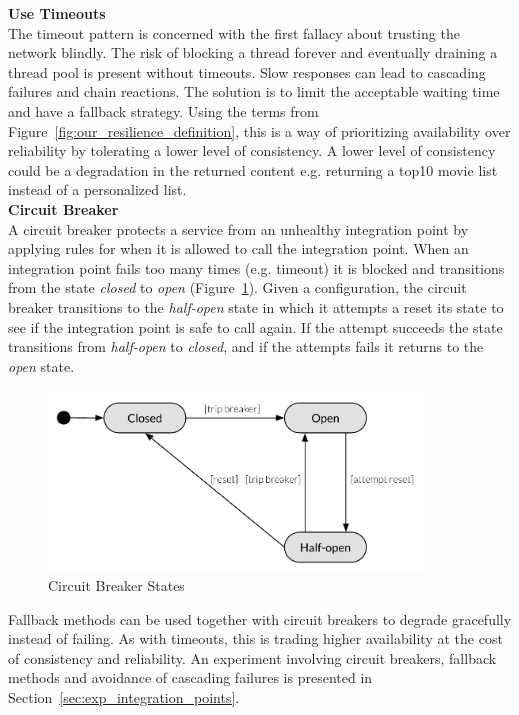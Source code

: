 \noindent \textbf{Use Timeouts}
\\
The timeout pattern is concerned with the first fallacy about trusting the network blindly. The risk of blocking a thread forever and eventually draining a thread pool is present without timeouts. Slow responses can lead to cascading failures and chain reactions. The solution is to limit the acceptable waiting time and have a fallback strategy. Using the terms from Figure~\ref{fig:our_resilience_definition}, this is a way of prioritizing availability over reliability by tolerating a lower level of consistency. A lower level of consistency could be a degradation in the returned content e.g. returning a top10 movie list instead of a personalized list. \\

\noindent \textbf{Circuit Breaker}
\\
A circuit breaker protects a service from an unhealthy integration point by applying rules for when it is allowed to call the integration point. When an integration point fails too many times (e.g. timeout) it is blocked and transitions from the state \textit{closed} to \textit{open} (Figure~\ref{fig:circuit_breaker_states}). Given a configuration, the circuit breaker transitions to the \textit{half-open} state in which it attempts a reset its state to see if the integration point is safe to call again. If the attempt succeeds the state transitions from \textit{half-open} to \textit{closed}, and if the attempts fails it returns to the \textit{open} state.

\begin{figure}[H]
    \centering
    \includegraphics[width=10cm]{figures/circuit_breaker_state_diagram}
    \caption{Circuit Breaker States}
    \label{fig:circuit_breaker_states}
\end{figure}

\noindent 
Fallback methods can be used together with circuit breakers to degrade gracefully instead of failing. As with timeouts, this is trading higher availability at the cost of consistency and reliability. An experiment involving circuit breakers, fallback methods and avoidance of cascading failures is presented in Section~\ref{sec:exp_integration_points}. \\


